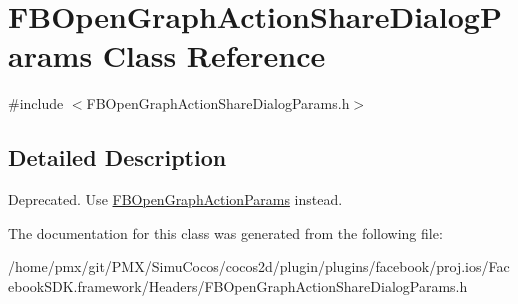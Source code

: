 \hypertarget{classFBOpenGraphActionShareDialogParams}{}\section{F\+B\+Open\+Graph\+Action\+Share\+Dialog\+Params Class Reference}
\label{classFBOpenGraphActionShareDialogParams}


{\ttfamily \#include $<$F\+B\+Open\+Graph\+Action\+Share\+Dialog\+Params.\+h$>$}



\subsection{Detailed Description}
Deprecated. Use {\ttfamily \hyperlink{interfaceFBOpenGraphActionParams}{F\+B\+Open\+Graph\+Action\+Params}} instead. 

The documentation for this class was generated from the following file\+:\begin{DoxyCompactItemize}
\item 
/home/pmx/git/\+P\+M\+X/\+Simu\+Cocos/cocos2d/plugin/plugins/facebook/proj.\+ios/\+Facebook\+S\+D\+K.\+framework/\+Headers/F\+B\+Open\+Graph\+Action\+Share\+Dialog\+Params.\+h\end{DoxyCompactItemize}
